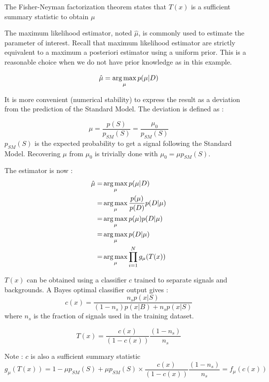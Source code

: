 The Fisher-Neyman factorization theorem \needcite states that $T(x)$ is a sufficient summary statistic to obtain $\mu$

The maximum likelihood estimator, noted $\hat \mu$, is commonly used to estimate the parameter of interest.
Recall that maximum likelihood estimator are strictly equivalent to a maximum a posteriori estimator using a uniform prior.
This is a reasonable choice when we do not have prior knowledge as in this example.

\begin{equation}
	\hat \mu = \operatorname*{arg\,max}_\mu p(\mu | D)
\end{equation}

It is more convenient (numerical stability) to express the result as a deviation from the prediction of the Standard Model.
The deviation is defined as :

\begin{equation}
	\mu = \frac{p(S)}{p_{SM}(S)} = \frac{\mu_0}{p_{SM}(S)}
\end{equation}
$p_{SM}(S)$ is the expected probability to get a signal following the Standard Model.
Recovering $\mu$ from $\mu_0$ is trivially done with $\mu_0 = \mu p_{SM}(S)$.

The estimator is now :
\begin{align}
	\hat\mu =& \operatorname*{arg\,max}_\mu p(\mu | D) \\
	     =& \operatorname*{arg\,max}_\mu \frac{p(\mu)}{p(D)} p(D | \mu) \\
	     =& \operatorname*{arg\,max}_\mu p(\mu) p(D | \mu) \\
	     =& \operatorname*{arg\,max}_\mu  p(D | \mu) \\
	     =& \operatorname*{arg\,max}_\mu  \prod_{i=1}^N g_\mu(T(x)) \\
\end{align}


$T(x)$ can be obtained using a classifier $c$ trained to separate signals and backgrounds.
A Bayes optimal classifier output gives :
\begin{equation}
	c(x) = \frac{n_s p(x|S)}{(1-n_s) p(x|B) + n_s p(x|S)}
\end{equation}
where $n_s$ is the fraction of signals used in the training dataset.

\begin{equation}
	T(x) = \frac{c(x)}{(1-c(x))} \frac{(1-n_s)}{n_s} 
\end{equation}


Note : $c$ is also a sufficient summary statistic
\begin{equation}
	g_\mu(T(x)) = 1 - \mu p_{SM}(S) + \mu p_{SM}(S) \times \frac{c(x)}{(1-c(x))} \frac{(1-n_s)}{n_s} = f_\mu(c(x))
\end{equation}

